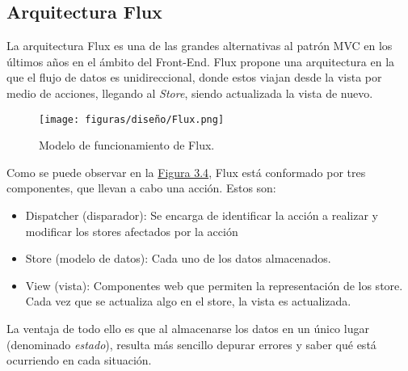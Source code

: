 \subsection{Arquitectura Flux}

La arquitectura Flux \cite{flux} es una de las grandes alternativas al patrón MVC en los últimos años en el ámbito del Front-End. Flux propone una arquitectura en la que el flujo de datos es unidireccional, donde estos viajan desde la vista por medio de acciones, llegando al {\it Store}, siendo actualizada la vista de nuevo.

\begin{figure}[H]
\centerline{\texttt{[image: figuras/diseño/Flux.png]}}
\caption{Modelo de funcionamiento de Flux.}
\label{enlaceImagenFlux}
\end{figure}

Como se puede observar en la \hyperref[enlaceImagenFlux]{Figura 3.4}, Flux está conformado por tres componentes, que llevan a cabo una acción. Estos son:
\begin{itemize}
    \item Dispatcher (disparador): Se encarga de identificar la acción a realizar y modificar los stores afectados por la acción
    \item Store (modelo de datos): Cada uno de los datos almacenados.
    \item View (vista): Componentes web que permiten la representación de los store. Cada vez que se actualiza algo en el store, la vista es actualizada.
\end{itemize}

La ventaja de todo ello es que al almacenarse los datos en un único lugar (denominado {\it estado}), resulta más sencillo depurar errores y saber qué está ocurriendo en cada situación.